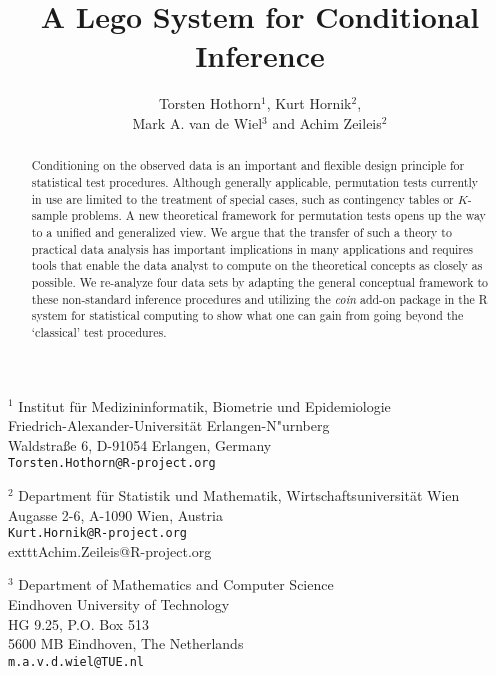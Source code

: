 \documentclass{article}
\newcommand{\Rpackage}[1]{\textit{#1}}
\newcommand{\RR}{\textsf{R}}
\begin{document}
\title{A Lego System for Conditional Inference}

\author{Torsten Hothorn$^1$, Kurt Hornik$^2$, \\ 
            Mark A. van de Wiel$^3$ and Achim Zeileis$^2$}

\date{}

\maketitle

\thispagestyle{empty}

\noindent$^1$ Institut f\"ur Medizininformatik, Biometrie und Epidemiologie\\
           Friedrich-Alexander-Universit\"at Erlangen-N"urnberg\\
           Waldstra{\ss}e 6, D-91054 Erlangen, Germany \\
           \texttt{Torsten.Hothorn@R-project.org}
         \newline

         \noindent$^2$ Department f\"ur Statistik und Mathematik,
            Wirtschaftsuniversit\"at Wien \\
            Augasse 2-6, A-1090 Wien, Austria \\
            \texttt{Kurt.Hornik@R-project.org} \\
            	exttt{Achim.Zeileis@R-project.org}
         \newline

         \noindent$^3$ Department of Mathematics and Computer Science \\
            Eindhoven University of Technology \\
            HG 9.25, P.O. Box 513 \\
            5600 MB Eindhoven, The Netherlands \\
            \texttt{m.a.v.d.wiel@TUE.nl}
         \newline

\begin{abstract}
Conditioning on the observed data is an important and flexible 
design principle for statistical test procedures. Although generally
applicable, permutation tests currently in use are limited to 
the treatment of special cases, such as contingency tables or $K$-sample
problems. A new theoretical framework for permutation
tests opens up the way to a unified and generalized view. We argue that the
transfer of such a theory to practical data analysis has important
implications in many applications and requires tools that enable the
data analyst to compute on the theoretical concepts as closely as possible.
We re-analyze four data sets
by adapting the general conceptual framework to these non-standard inference procedures
and
utilizing the \Rpackage{coin} add-on package in the \RR{} system for statistical computing
to show what one can gain from going beyond the `classical' test procedures.
\end{abstract}
\end{document}
